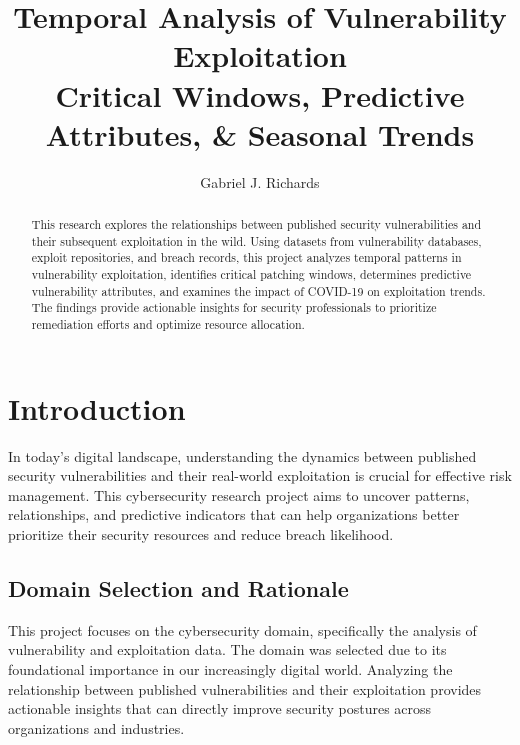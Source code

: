 \documentclass[runningheads]{llncs}
\begin{document}
%
\title{Temporal Analysis of Vulnerability Exploitation\\
Critical Windows, Predictive Attributes, \& Seasonal Trends}
%
%
\author{Gabriel J. Richards}
%
%
%
\maketitle              %
%
\begin{abstract}
This research explores the relationships between published security vulnerabilities and their subsequent exploitation in the wild. Using datasets from vulnerability databases, exploit repositories, and breach records, this project analyzes temporal patterns in vulnerability exploitation, identifies critical patching windows, determines predictive vulnerability attributes, and examines the impact of COVID-19 on exploitation trends. The findings provide actionable insights for security professionals to prioritize remediation efforts and optimize resource allocation.

\end{abstract}
%
%
%
\section{Introduction}

In today's digital landscape, understanding the dynamics between published security vulnerabilities and their real-world exploitation is crucial for effective risk management. This cybersecurity research project aims to uncover patterns, relationships, and predictive indicators that can help organizations better prioritize their security resources and reduce breach likelihood.

\subsection{Domain Selection and Rationale}
This project focuses on the cybersecurity domain, specifically the analysis of vulnerability and exploitation data. The domain was selected due to its foundational importance in our increasingly digital world. Analyzing the relationship between published vulnerabilities and their exploitation provides actionable insights that can directly improve security postures across organizations and industries.
\end{document}
